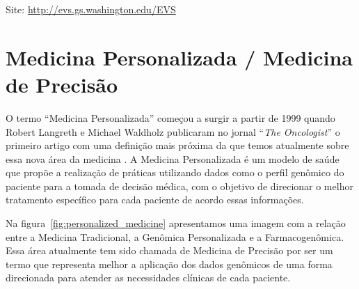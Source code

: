 Site: \url{http://evs.gs.washington.edu/EVS}

\section{Medicina Personalizada / Medicina de Precisão}

O termo ``Medicina Personalizada'' começou a surgir a partir de 1999 quando Robert Langreth e Michael Waldholz publicaram no jornal ``\textit{The Oncologist}'' o primeiro artigo com uma definição mais próxima da que temos atualmente sobre essa nova área da medicina \cite{Langreth1999}. A Medicina Personalizada é um modelo de saúde que propõe a realização de práticas utilizando dados como o perfil genômico do paciente para a tomada de decisão médica, com o objetivo de direcionar o melhor tratamento específico para cada paciente de acordo essas informações.

Na figura~\ref{fig:personalized_medicine} apresentamos uma imagem com a relação entre a Medicina Tradicional, a Genômica Personalizada e a Farmacogenômica. Essa área atualmente tem sido chamada de Medicina de Precisão \cite{Collins2015, Jameson} por ser um termo que representa melhor a aplicação dos dados genômicos de uma forma direcionada para atender as necessidades clínicas de cada paciente.


